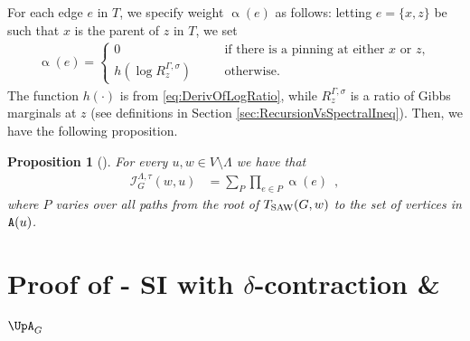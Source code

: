 \documentclass[11pt,reqno]{amsart}
\numberwithin{equation}{section}
\newtheorem{proposition}[theorem]{Proposition}
\newcommand{\cI}{{\mathcal{I}}}
\newcommand{\blue}[1]{{\color{blue}#1}}
\newcommand{\bluepigment}[1]{{\color{blue(pigment)}#1}}
\newcommand{\cadmiumgreen}[1]{{\color{cadmiumgreen}#1}}
\newcommand{\goldenbrown}[1]{{\color{goldenbrown}#1}}
\newcommand{\heliotrope}[1]{{\color{heliotrope}#1}}
\newcommand{\red}[1]{{\color{red}#1}}
\newcommand{\gratio}{{R}}
\newcommand{\dlogtrecur}{h}
\newcommand{\Tsaw}{T_{\rm SAW}}
\newcommand{\cp}{{\tt A}}
\newcommand{\infmatrix}{\cI}
\newcommand{\Adjacency}{{\UpA}}
\newcommand{\spreadpoint}{\newpage}
\newcommand{\LastReviewG}[1]{{\color{magenta}\hspace{.2cm} [Rev: \textrm{#1} - \bluepigment{G} ] \hspace{.2cm}}}
\renewcommand{\LastReviewG}[1]{}
\renewcommand{\spreadpoint}{}
\renewcommand{\blue}[1]{#1}
\renewcommand{\bluepigment}[1]{#1}
\renewcommand{\cadmiumgreen}[1]{#1}
\renewcommand{\goldenbrown}[1]{#1}
\renewcommand{\heliotrope}[1]{#1}
\renewcommand{\red}[1]{#1}
\newcommand{\ke}{\blue{e}}
\newcommand{\kP}{\goldenbrown{P}}
\newcommand{\ku}{\red{u}}
\newcommand{\kw}{\blue{w}}
\newcommand{\kx}{\heliotrope{x}}
\newcommand{\kz}{\cadmiumgreen{z}}
\renewcommand{\ke}{e}
\renewcommand{\kP}{P}
\renewcommand{\ku}{u}
\renewcommand{\kw}{w}
\renewcommand{\kx}{x}
\renewcommand{\kz}{z}
\newcommand{\infweight}{\upalpha}
\begin{document}
For each edge $\ke$ in $T$, we specify weight $\infweight(\ke)$ as follows: letting $\ke=\{\kx,\kz\}$ be such 
that $\kx$ is the parent of $\kz$ in $T$, we set 
%
\begin{align}\label{def:OfInfluenceWeights}
\infweight(\ke)=\left \{ 
\begin{array}{lcl}
0 & \quad&\textrm{if there is a pinning at either $\kx$ or $\kz$},\\
\textstyle \dlogtrecur\left(\log \gratio^{\Gamma, \sigma}_{\kz}\right) & & \textrm{otherwise}.
\end{array}
\right .
\end{align}
The function $\dlogtrecur(\cdot)$ is from \eqref{eq:DerivOfLogRatio}, while $\gratio^{\Gamma, \sigma}_{\kz}$ 
is a ratio of Gibbs marginals at $\kz$ (see definitions in Section \ref{sec:RecursionVsSpectralIneq}). 
%
Then, we have the following proposition.  
\begin{proposition}[\cite{OptMCMCIS,VigodaSpectralInd}]\label{prop:Inf2TreeRedaux}
For every $\ku,\kw\in V\setminus \Lambda$ we have that 
\begin{align}\label{eq:InfluenceEntryAsWeightedSum}
\infmatrix^{\Lambda,\tau}_{G}(\kw,\ku) &=\sum\nolimits_{\kP}\prod\nolimits_{\ke\in \kP}\infweight(\ke) \enspace,
\end{align}
where $\kP$ varies over all paths from the root of $\Tsaw(G,\kw)$ to the set of vertices in $\cp(\ku)$. 
\end{proposition}







\spreadpoint


\section{Proof of  - SI with $\delta$-contraction \& $\Adjacency_G$ \LastReviewG{2025-03-1}}\label{sec:thrm:AdjacencyInfinityMixing}
\end{document}
